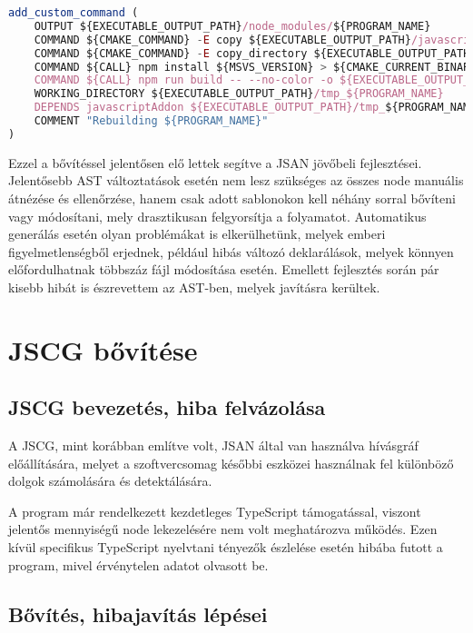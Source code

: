 \begin{lstlisting}[caption={JSAN Cmake utasítások},label={lst:jsancmake}, language={JavaScript}]
add_custom_command (
    OUTPUT ${EXECUTABLE_OUTPUT_PATH}/node_modules/${PROGRAM_NAME}
    COMMAND ${CMAKE_COMMAND} -E copy ${EXECUTABLE_OUTPUT_PATH}/javascriptAddon.node ${EXECUTABLE_OUTPUT_PATH}/tmp_${PROGRAM_NAME}/
    COMMAND ${CMAKE_COMMAND} -E copy_directory ${EXECUTABLE_OUTPUT_PATH}/../lib/javascript/addon/ast ${EXECUTABLE_OUTPUT_PATH}/tmp_${PROGRAM_NAME}/src/ast/
    COMMAND ${CALL} npm install ${MSVS_VERSION} > ${CMAKE_CURRENT_BINARY_DIR}/${PROGRAM_NAME}-npm-install.log 2>&1
    COMMAND ${CALL} npm run build -- --no-color -o ${EXECUTABLE_OUTPUT_PATH}/node_modules/${PROGRAM_NAME} > ${CMAKE_CURRENT_BINARY_DIR}/${PROGRAM_NAME}-npm-build.log 2>&1
    WORKING_DIRECTORY ${EXECUTABLE_OUTPUT_PATH}/tmp_${PROGRAM_NAME}
    DEPENDS javascriptAddon ${EXECUTABLE_OUTPUT_PATH}/tmp_${PROGRAM_NAME}
    COMMENT "Rebuilding ${PROGRAM_NAME}"
)
\end{lstlisting}

Ezzel a bővítéssel jelentősen elő lettek segítve a JSAN jövőbeli fejlesztései. Jelentősebb AST változtatások esetén nem lesz szükséges az összes node manuális átnézése és ellenőrzése, hanem csak adott sablonokon kell néhány sorral bővíteni vagy módosítani, mely drasztikusan felgyorsítja a folyamatot. Automatikus generálás esetén olyan problémákat is elkerülhetünk, melyek emberi figyelmetlenségből erjednek, például hibás változó deklarálások, melyek könnyen előfordulhatnak többszáz fájl módosítása esetén. Emellett fejlesztés során pár kisebb hibát is észrevettem az AST-ben, melyek javításra kerültek. 

\section{JSCG bővítése}

\subsection{JSCG bevezetés, hiba felvázolása}
A JSCG, mint korábban említve volt, JSAN által van használva hívásgráf előállítására, melyet a szoftvercsomag későbbi eszközei használnak fel különböző dolgok számolására és detektálására.

A program már rendelkezett kezdetleges TypeScript támogatással, viszont jelentős mennyiségű node lekezelésére nem volt meghatározva működés. Ezen kívül specifikus TypeScript nyelvtani tényezők észlelése esetén hibába futott a program, mivel érvénytelen adatot olvasott be.

\subsection{Bővítés, hibajavítás lépései}
